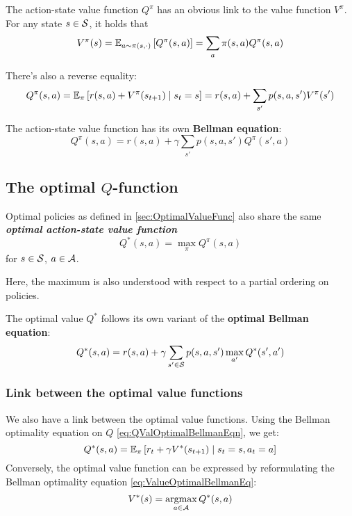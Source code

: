 \documentclass[../course-notes.tex]{subfiles}
\begin{document}
The action-state value function $Q^\pi$ has an obvious link to the value function $V^\pi$.
For any state $s\in\mathcal{S}$, it holds that
\begin{equation}\label{eq:ValueFunctionExpectationLink}
	V^\pi(s) = \operatorname{\mathbb{E}}_{a\sim \pi(s,\cdot)}\left[
	Q^\pi(s, a)
	\right]
	= \sum_a \pi(s,a) Q^\pi(s,a)
\end{equation}

There's also a reverse equality:
\begin{equation}
	Q^\pi(s,a) =
	\operatorname{\mathbb{E}}_{\pi}\left[
		r(s,a) + V^\pi(s_{t+1})
		\;\middle|\; s_t = s
	\right]
	=
	r(s, a) + \sum_{s'} p(s,a,s') V^\pi(s')
\end{equation}

The action-state value function has its own \textbf{\bluefont Bellman equation}:
\begin{equation}
	Q^\pi(s,a) = r(s,a) + \gamma
	\sum_{s'} p(s,a,s') Q^\pi(s',a)
\end{equation}


\subsection{The optimal $Q$-function}

\begin{defn}
	Optimal policies as defined in \cref{sec:OptimalValueFunc} also share the same \emph{\bfseries\bluefont optimal action-state value function}
	\begin{equation}
	Q^*(s,a) = \max_\pi Q^\pi(s,a)
	\end{equation}
	for $s\in\mathcal{S}$, $a\in\mathcal{A}$.	
\end{defn}

Here, the maximum is also understood with respect to a partial ordering on policies.

The optimal value $Q^*$ follows its own variant of the \textbf{\bluefont optimal Bellman equation}:
\begin{equation}\label{eq:QValOptimalBellmanEqn}
	Q^*(s,a) = r(s,a) + 
	\gamma\sum_{s'\in\mathcal{S}} p(s,a,s') \max_{a'} Q^*(s',a')
\end{equation}


\subsubsection{Link between the optimal value functions}

We also have a link between the optimal value functions. Using the Bellman optimality equation on $Q$ \eqref{eq:QValOptimalBellmanEqn}, we get:
\[
	Q^*(s,a) = \operatorname{\mathbb{E}}_\pi\left[
	r_t + \gamma V^*(s_{t+1}) \;\middle|\; s_t=s, a_t=a
	\right]
\]
Conversely, the optimal value function can be expressed by reformulating the Bellman optimality equation \eqref{eq:ValueOptimalBellmanEq}:
\begin{equation}
	V^*(s) =
	\operatorname*{\mathrm{argmax}}_{a\in\mathcal{A}} Q^*(s,a)
\end{equation}
\end{document}
